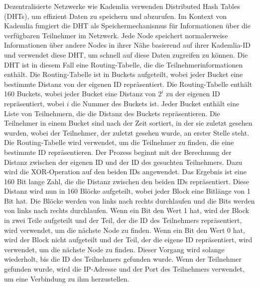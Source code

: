 Dezentralisierte Netzwerke wie Kademlia verwenden Distributed Hash Tables (DHTs), um effizient Daten zu speichern und abzurufen. Im Kontext von Kademlia fungiert die DHT als Speichermechanismus für Informationen über die verfügbaren Teilnehmer im Netzwerk. Jede Node speichert normalerweise Informationen über andere Nodes in ihrer Nähe basierend auf ihrer Kademlia-ID und verwendet diese DHT, um schnell auf diese Daten zugreifen zu können. Die DHT ist in diesem Fall eine Routing-Tabelle, die die Teilnehmerinformationen enthält. Die Routing-Tabelle ist in Buckets aufgeteilt, wobei jeder Bucket eine bestimmte Distanz von der eigenen ID repräsentiert. Die Routing-Tabelle enthält 160 Buckets, wobei jeder Bucket eine Distanz von $2^{i}$ zu der eigenen ID repräsentiert, wobei $i$ die Nummer des Buckets ist. Jeder Bucket enthält eine Liste von Teilnehmern, die die Distanz des Buckets repräsentieren. Die Teilnehmer in einem Bucket sind nach der Zeit sortiert, in der sie zuletzt gesehen wurden, wobei der Teilnehmer, der zuletzt gesehen wurde, an erster Stelle steht. Die Routing-Tabelle wird verwendet, um die Teilnehmer zu finden, die eine bestimmte ID repräsentieren. Der Prozess beginnt mit der Berechnung der Distanz zwischen der eigenen ID und der ID des gesuchten Teilnehmers. Dazu wird die XOR-Operation auf den beiden IDs angewendet. Das Ergebnis ist eine 160 Bit lange Zahl, die die Distanz zwischen den beiden IDs repräsentiert. Diese Distanz wird nun in 160 Blöcke aufgeteilt, wobei jeder Block eine Bitlänge von 1 Bit hat. Die Blöcke werden von links nach rechts durchlaufen und die Bits werden von links nach rechts durchlaufen. Wenn ein Bit den Wert 1 hat, wird der Block in zwei Teile aufgeteilt und der Teil, der die ID des Teilnehmers repräsentiert, wird verwendet, um die nächste Node zu finden. Wenn ein Bit den Wert 0 hat, wird der Block nicht aufgeteilt und der Teil, der die eigene ID repräsentiert, wird verwendet, um die nächste Node zu finden. Dieser Vorgang wird solange wiederholt, bis die ID des Teilnehmers gefunden wurde. Wenn der Teilnehmer gefunden wurde, wird die IP-Adresse und der Port des Teilnehmers verwendet, um eine Verbindung zu ihm herzustellen.
